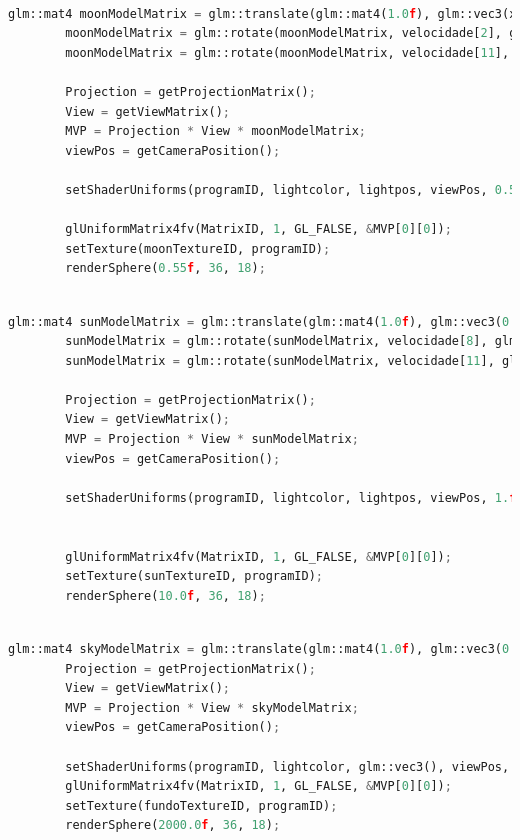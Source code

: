 \documentclass[12pt,a4paper]{memoir}
\begin{document}
\begin{lstlisting}[language=Python, caption=Renderização da Lua]

glm::mat4 moonModelMatrix = glm::translate(glm::mat4(1.0f), glm::vec3(x[2] + x[8], 0.0f, y[2] + y[8]));
        moonModelMatrix = glm::rotate(moonModelMatrix, velocidade[2], glm::vec3(0.0f, 1.0f, 0.0f));
        moonModelMatrix = glm::rotate(moonModelMatrix, velocidade[11], glm::vec3(0.5f, 0.0f, 0.0f));

        Projection = getProjectionMatrix();
        View = getViewMatrix();
        MVP = Projection * View * moonModelMatrix;
        viewPos = getCameraPosition();

        setShaderUniforms(programID, lightcolor, lightpos, viewPos, 0.5f, 0.5f, 3.0f, Projection, View, moonModelMatrix);

        glUniformMatrix4fv(MatrixID, 1, GL_FALSE, &MVP[0][0]);
        setTexture(moonTextureID, programID);
        renderSphere(0.55f, 36, 18);

\end{lstlisting}

\newpage

\begin{lstlisting}[language=Python, caption=Renderização do Sol]

glm::mat4 sunModelMatrix = glm::translate(glm::mat4(1.0f), glm::vec3(0.0f, 0.0f, 0.0f));
        sunModelMatrix = glm::rotate(sunModelMatrix, velocidade[8], glm::vec3(0.0f, 1.0f, 0.0f));
        sunModelMatrix = glm::rotate(sunModelMatrix, velocidade[11], glm::vec3(1.0f, 0.0f, 0.0f));
       
        Projection = getProjectionMatrix();
        View = getViewMatrix();
        MVP = Projection * View * sunModelMatrix;
        viewPos = getCameraPosition();

        setShaderUniforms(programID, lightcolor, lightpos, viewPos, 1.f, 0.1f, 51.2f, Projection, View, sunModelMatrix);


        glUniformMatrix4fv(MatrixID, 1, GL_FALSE, &MVP[0][0]);
        setTexture(sunTextureID, programID);
        renderSphere(10.0f, 36, 18);

\end{lstlisting}

\begin{lstlisting}[language=Python, caption=Renderização do espaço sideral]

glm::mat4 skyModelMatrix = glm::translate(glm::mat4(1.0f), glm::vec3(0.0f, 0.0f, 0.0f));
        Projection = getProjectionMatrix();
        View = getViewMatrix();
        MVP = Projection * View * skyModelMatrix;
        viewPos = getCameraPosition();

        setShaderUniforms(programID, lightcolor, glm::vec3(), viewPos, 1.0f, 0.f, 0.0f, Projection, View, skyModelMatrix);
        glUniformMatrix4fv(MatrixID, 1, GL_FALSE, &MVP[0][0]);
        setTexture(fundoTextureID, programID);
        renderSphere(2000.0f, 36, 18);

\end{lstlisting}
\end{document}
